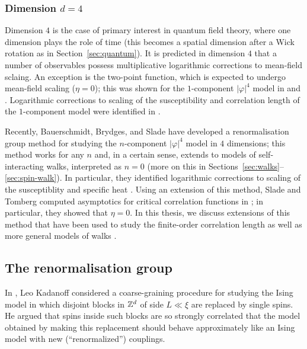 \subsubsection{Dimension $d = 4$}

Dimension $4$ is the case of primary interest in quantum field theory, where one
dimension plays the role of time (this becomes a spatial dimension after a Wick
rotation as in Section~\ref{sec:quantum}).
It is predicted in dimension $4$ that a number of observables possess multiplicative
logarithmic corrections to mean-field sclaing. An exception is the two-point function,
which is expected to undergo
mean-field scaling ($\eta = 0$); this was shown for the $1$-component $|\varphi|^4$
model in \cite{GK85} and \cite{FMRS87}. Logarithmic corrections to scaling of the
susceptibility and correlation length of the $1$-component model were identified in
\cite{Hara87,HT87}.

Recently, Bauerschmidt, Brydges, and Slade \cite{BS-rg-norm,BS-rg-loc,BBS-rg-pt,BS-rg-IE,BS-rg-step}
have developed a renormalisation group
method for studying the $n$-component $|\varphi|^4$ model in $4$ dimensions; this
method works for any $n$ and, in a certain sense, extends to models of
self-interacting walks, interpreted as $n = 0$ (more on this in
Sections~\ref{sec:walks}--\ref{sec:spin-walk}).
In particular, they identified logarithmic corrections to scaling of the susceptiblity
and specific heat \cite{BBS-phi4-log}. Using an extension of this method, Slade and
Tomberg computed asymptotics for critical correlation functions in \cite{ST-phi4};
in particular, they showed that $\eta = 0$.
In this thesis, we discuss extensions of this method that have been used to study
the finite-order correlation length \cite{BSTW-clp} as well as more general models
of walks \cite{BSW-saw-sa}.


\subsection{The renormalisation group}
\label{sec:rg-intro}

In \cite{Kada66}, Leo Kadanoff considered a coarse-graining procedure for
studying the Ising model in which disjoint
blocks in ${ {{\mathbb Z}}^d }$ of side $L \ll \xi$ are replaced by single spins. He argued
that spins inside such blocks are so strongly correlated that the model
obtained by making this replacement should behave approximately like an Ising
model with new (``renormalized'') couplings.

